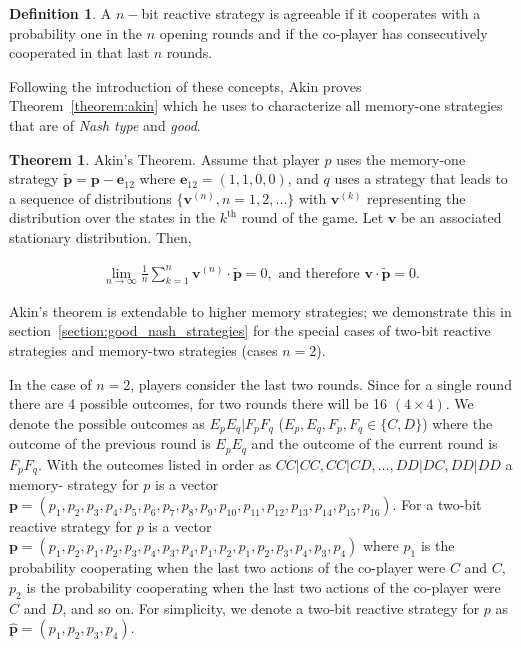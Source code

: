 \documentclass{article}
\theoremstyle{definition}
\newtheorem{definition}{Definition}[section]
\newtheorem{theorem}{Theorem}[section]
\begin{document}
\begin{definition}\label{definition:nbit_agreeable} A \(n-\)bit reactive strategy is
agreeable if it cooperates with a probability one in the \(n\) opening rounds
and if the co-player has consecutively cooperated in that last \(n\) rounds.
\end{definition}

Following the introduction of these concepts, Akin proves
Theorem~\ref{theorem:akin} which he uses to characterize all memory-one
strategies that are of \textit{Nash type} and \textit{good}.

\begin{theorem}{Akin's Theorem.}
  Assume that player \(p\) uses the memory-one strategy \(\mathbf{\tilde{p}} = \mathbf{p} - \mathbf{e}_{12}\) where
  \(\mathbf{e}_{12} = (1, 1, 0, 0)\), and \(q\) uses a strategy that leads to a sequence
  of distributions \(\{\mathbf{v}^{(n)}, n = 1, 2, ...\}\) with \(\mathbf{v}^{(k)}\) representing the
  distribution over the states in the \(k^{\text{th}}\) round of the game. Let
  \(\mathbf{v}\) be an associated stationary distribution. Then,

  \begin{align}
    \lim_{n \rightarrow \infty} \frac{1}{n} \sum_{k=1}^{n} \mathbf{v}^{(n)} \cdot \mathbf{\tilde{p}} = 0, \text{ and therefore } \mathbf{v} \cdot \mathbf{\tilde{p}} = 0.
  \end{align}
\end{theorem}\label{theorem:akin}

Akin's theorem is extendable to higher memory strategies; we demonstrate this in section~\ref{section:good_nash_strategies}
for the special cases of two-bit reactive strategies and memory-two strategies (cases \(n=2\)).

In the case of \(n=2\), players consider the last two rounds. Since for a single
round there are 4 possible outcomes, for two rounds there will be 16 \((4 \times
4)\). We denote the possible outcomes as \(E_p E_q | F_p F_q\) (\(E_p, E_q, F_p,
F_q \in \{C, D\}\)) where the outcome of the previous round is \(E_p E_q\) and
the outcome of the current round is \(F_p F_q\). With the outcomes listed in
order as \(CC|CC, CC|CD, \dots, DD|DC, DD|DD\) a memory- strategy for \(p\) is a
vector \(\mathbf{p} = (p_1, p_2, p_3, p_4, p_5, p_6, p_7, p_8, p_9, p_{10},
p_{11}, p_{12}, p_{13}, p_{14}, \allowbreak p_{15}, p_{16})\). For a two-bit
reactive strategy for \(p\) is a vector \(\mathbf{p} = (p_1, p_2, p_1, p_2, p_3,
p_4, p_3, p_4, p_1, p_2, p_1, p_2, p_3, p_4, \allowbreak p_3, p_4)\) where
\(p_1\) is the probability cooperating when the last two actions of the
co-player were \(C\) and \(C\), \(p_2\) is the probability cooperating when the
last two actions of the co-player were \(C\) and \(D\), and so on. For
simplicity, we denote a two-bit reactive strategy for \(p\) as
\(\mathbf{\hat{p}} = (p_1, p_2, p_3, p_4)\).
\end{document}
